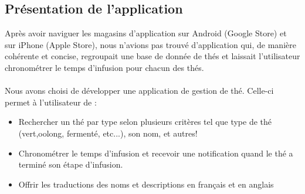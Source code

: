 \documentclass[a4paper,12pt]{article}
\begin{document}
	\begin{spacing}{1}

	\section*{Présentation de l'application}
	Après avoir naviguer les magasins d'application sur Android (Google Store) et sur iPhone (Apple Store), nous n'avions pas trouvé d'application qui, de manière cohérente et concise, regroupait une base de donnée de thés et laissait l'utilisateur chronométrer le temps d'infusion pour chacun des thés.\\\\
	Nous avons choisi de développer une application de gestion de thé. Celle-ci permet à l'utilisateur de : 
	\begin{itemize}
		\item Rechercher un thé par type selon plusieurs critères tel que type de thé (vert,oolong, fermenté, etc...), son nom, et autres!
		\item Chronométrer le temps d'infusion et recevoir une notification quand le thé a terminé son étape d'infusion.
		\item Offrir les traductions des noms et descriptions en français et en anglais
	\end{itemize}
	

\end{spacing}
\end{document}
